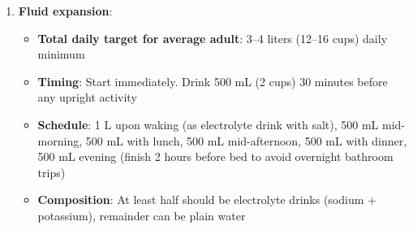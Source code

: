 \begin{enumerate}
\begin{itemize}
\begin{itemize}
            \item \textbf{Edema monitoring}: Some peripheral edema (ankle swelling) is expected and acceptable. If severe edema develops (unable to wear shoes, leg pitting), reduce sodium by 2--3 g/day.
            \item \textbf{Kidney function}: If you have normal kidney function (normal creatinine), high sodium is generally safe. If kidney disease present, consult nephrologist before high-salt protocol.
            \item \textbf{Heart failure contraindication}: DO NOT use if you have heart failure (systolic or diastolic dysfunction). Sodium loading worsens heart failure by increasing preload.
        \end{itemize}
        \item \textbf{Timing}: Start immediately. Frontload morning: 2--3 g sodium (via electrolyte drink or salt tablets) with 1 liter water within 2 hours of waking
        \item \textbf{Schedule}: Morning bolus (2--3 g sodium from electrolyte drinks), then 1--2 g with each meal, 1--2 g mid-afternoon
        \item \textbf{Salt tablets option}: Thermotabs (1 g sodium each, take 1--2 tablets 3--4 times daily with meals) OR SaltStick capsules (215 mg sodium each, take 4--5 capsules 3--4 times daily)
        \item \textbf{ABSOLUTE CONTRAINDICATIONS}: DO NOT use if you have hypertension (BP $>$140/90), heart failure, advanced kidney disease (eGFR $<$30), or are taking loop diuretics. Relative caution with ACE inhibitors (may be used together under physician supervision).
        \item \textbf{Monitoring}: Blood pressure (daily $\times$ 2 weeks, then weekly), weight (weekly - watch for $>$5 lb gain/week), peripheral edema (daily), serum sodium (monthly if high-risk).
    \end{itemize}

    \item \textbf{Fluid expansion}:
    \begin{itemize}
        \item \textbf{Total daily target for average adult}: 3--4 liters (12--16 cups) daily minimum
        \item \textbf{Timing}: Start immediately. Drink 500 mL (2 cups) 30 minutes before any upright activity
        \item \textbf{Schedule}: 1 L upon waking (as electrolyte drink with salt), 500 mL mid-morning, 500 mL with lunch, 500 mL mid-afternoon, 500 mL with dinner, 500 mL evening (finish 2 hours before bed to avoid overnight bathroom trips)
        \item \textbf{Composition}: At least half should be electrolyte drinks (sodium + potassium), remainder can be plain water
    \end{itemize}


\end{enumerate}
